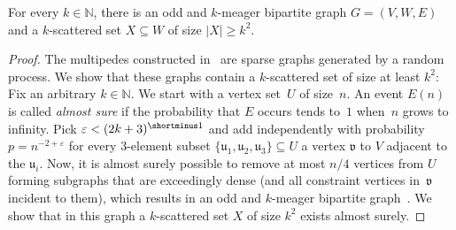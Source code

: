 \documentclass[]{lmcs}
\renewcommand{\epsilon}{\varepsilon}
\newcommand{\nat}{\mathbb{N}}
\newcommand{\defining}[1]{\emph{#1}}
\newcommand{\set}[1]{\lbrace #1 \rbrace}
\newcommand{\inv}[1]{#1^{\shortminus 1}}
\newcommand{\bVertA}{\mathfrak{u}}
\newcommand{\bVertB}{\mathfrak{v}}
\newcommand{\gadgetsb}{V}
\newcommand{\feetb}{W}
\newcommand{\footbset}{X}
\begin{document}
\begin{lem}
	\label{lem:odd-meager-distance-base-graph}
	For every $k \in \nat$,
	there is an odd and $k$-meager bipartite graph
	$G=(\gadgetsb,\feetb,E)$
	and a $k$-scattered set $\footbset \subseteq \feetb$
	of size $|\footbset| \geq k^2$.
\end{lem}
\begin{proof}
	The multipedes constructed in~\cite{GurevichShelah96}
	are sparse graphs generated by a random process.
	We show that these graphs contain a $k$-scattered set of size at least $k^2$:
	Fix an arbitrary $k \in \nat$.
	We start with a vertex set~$U$ of size~$n$.
	An event $E(n)$ is called \defining{almost sure}
	if the probability that $E$ occurs tends to~$1$ when~$n$ grows to infinity.
	Pick $\epsilon < \inv{(2k + 3)}$
	and add independently with probability $p=n^{-2+\epsilon}$ for every $3$-element subset $\set{\bVertA_1,\bVertA_2,\bVertA_3} \subseteq U$
	a vertex $\bVertB$ to $\gadgetsb$ adjacent to the $\bVertA_i$.
	Now, it is almost surely possible to remove at most $n/4$ vertices from $U$ forming subgraphs that are exceedingly dense
	(and all constraint vertices in~$\bVertB$ incident to them),
	which results in an odd and $k$-meager bipartite graph~\cite{GurevichShelah96}.
	We show that in this graph a $k$-scattered set $\footbset$ of size $k^2$ exists almost surely.
	

\end{proof}
\end{document}
